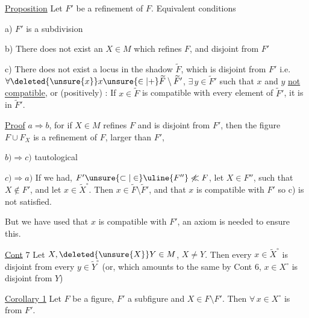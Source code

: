 \uline{Proposition} Let $F'$ be a refinement of $F$. Equivalent conditions

a) $F'$ is a subdivision

b) There does not exist an $X\in M$ which refines $F$, and disjoint from $F'$

c)  There does not exist a locus in the shadow $\widetilde F$, which is disjoint from $F'$ i.e.  $\forall\deleted{\unsure{x}}x\unsure{\in|+}\widetilde F\setminus\widetilde F'$, $\exists\,y\in\widetilde F'$ such that $x$ and $y$ \uline{not compatible}, or (positively) : If $x\in\widetilde F$ is compatible with every element of $\widetilde F'$, it is in $\widetilde F'$.

\uline{Proof} $a\Longrightarrow b$, for if $X\in M$ refines $F$ and is disjoint from $F'$, then the figure $F\cup F_X$ is a refinement of $F$,  larger than $F'$,

$b)\Longrightarrow c)$ tautological

$c)\Longrightarrow a)$ If we had, $F'\unsure{\subset|\in} \uline{F''}\not\ll F$, let $X\in F''$, such that $X\notin F'$, and let $x\in\widetilde X^\circ$. Then $x\in\widetilde F\setminus\widetilde F'$, and  that $x$ is compatible with $F'$ so c) is not satisfied.

But we have used that $x$ is compatible with $F'$, an axiom is needed to ensure this.

\uline{Cont} 7 Let $X,\deleted{\unsure{X}}Y\in M$,  $X\ne Y$.  Then every $x\in\widetilde X^\circ$ is disjoint from every $y\in\widetilde Y^\circ$ (or, which amounts to the same by Cont 6,  $x\in X^\circ$ is disjoint from $Y$)

\uline{Corollary 1} Let $F$ be a figure, $F'$ a subfigure and $X\in F\setminus F'$. Then $\forall\,x\in X^\circ$ is   from $F'$.
